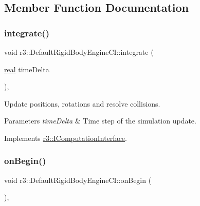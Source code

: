 \subsection{Member Function Documentation}
\mbox{\label{classr3_1_1_default_rigid_body_engine_c_i_a4b79e7e4bc76eedcad7ef5c4777b9d33}} 
\subsubsection{\texorpdfstring{integrate()}{integrate()}}
{\footnotesize\ttfamily void r3\+::\+Default\+Rigid\+Body\+Engine\+C\+I\+::integrate (\begin{DoxyParamCaption}\item[{\mbox{\hyperlink{namespacer3_ab2016b3e3f743fb735afce242f0dc1eb}{real}}}]{time\+Delta }\end{DoxyParamCaption})\hspace{0.3cm}{\ttfamily [override]}, {\ttfamily [virtual]}}



Update positions, rotations and resolve collisions. 


\begin{DoxyParams}{Parameters}
{\em time\+Delta} & Time step of the simulation update. \\
\hline
\end{DoxyParams}


Implements \mbox{\hyperlink{classr3_1_1_i_computation_interface_a162250f2b6efbd85460bd0f780d42cff}{r3\+::\+I\+Computation\+Interface}}.

\mbox{\label{classr3_1_1_default_rigid_body_engine_c_i_a5d9e40ea40845499f01081d21cd9ff64}} 
\subsubsection{\texorpdfstring{on\+Begin()}{onBegin()}}
{\footnotesize\ttfamily void r3\+::\+Default\+Rigid\+Body\+Engine\+C\+I\+::on\+Begin (\begin{DoxyParamCaption}{ }\end{DoxyParamCaption})\hspace{0.3cm}{\ttfamily [override]}, {\ttfamily [virtual]}}



